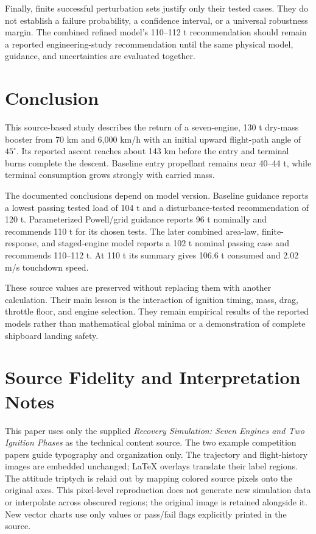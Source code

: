 \documentclass[11pt,a4paper]{article}
\begin{document}
Finally, finite successful perturbation sets justify only their tested cases. They do not establish a failure probability, a confidence interval, or a universal robustness margin. The combined refined model's 110--112 t recommendation should remain a reported engineering-study recommendation until the same physical model, guidance, and uncertainties are evaluated together.

\section{Conclusion}
This source-based study describes the return of a seven-engine, 130 t dry-mass booster from 70 km and 6,000 km/h with an initial upward flight-path angle of $45^\circ$. Its reported ascent reaches about 143 km before the entry and terminal burns complete the descent. Baseline entry propellant remains near 40--44 t, while terminal consumption grows strongly with carried mass.

The documented conclusions depend on model version. Baseline guidance reports a lowest passing tested load of 104 t and a disturbance-tested recommendation of 120 t. Parameterized Powell/grid guidance reports 96 t nominally and recommends 110 t for its chosen tests. The later combined area-law, finite-response, and staged-engine model reports a 102 t nominal passing case and recommends 110--112 t. At 110 t its summary gives 106.6 t consumed and 2.02 m/s touchdown speed.

These source values are preserved without replacing them with another calculation. Their main lesson is the interaction of ignition timing, mass, drag, throttle floor, and engine selection. They remain empirical results of the reported models rather than mathematical global minima or a demonstration of complete shipboard landing safety.

\clearpage
\appendix
\section{Source Fidelity and Interpretation Notes}
This paper uses only the supplied \emph{Recovery Simulation: Seven Engines and Two Ignition Phases} as the technical content source. The two example competition papers guide typography and organization only. The trajectory and flight-history images are embedded unchanged; LaTeX overlays translate their label regions. The attitude triptych is relaid out by mapping colored source pixels onto the original axes. This pixel-level reproduction does not generate new simulation data or interpolate across obscured regions; the original image is retained alongside it. New vector charts use only values or pass/fail flags explicitly printed in the source.
\end{document}
